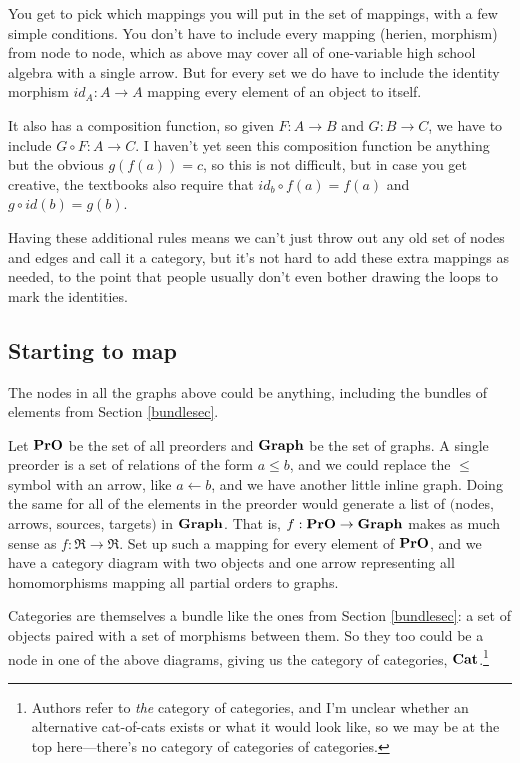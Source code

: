 \documentclass[11pt]{article}
\begin{document}
You get to pick which mappings you will put in the set of mappings, with a few simple conditions.
You don't have to include every mapping (herien, morphism) from node to node, which as above may cover all of one-variable high school algebra with a single arrow. But for every set we do have to include
the identity morphism $id_A:A\to A$ mapping every element of an object to itself.

It also has a composition function, so given $F:A\to B$
and $G:B\to C$, we have to include $G\circ F:A\to C$. I haven't yet seen this composition
function be anything but the obvious $g(f(a)) = c$, so this is not difficult, but in case
you get creative, the textbooks also require that $id_b\circ f(a)=f(a)$ and $g\circ id(b) = g(b)$.

Having these additional rules means we can't just throw out any old set of nodes and edges
and call it a category, but it's not hard to add these extra mappings as needed,
to the point that people usually don't even bother drawing the loops to mark the
identities.

\subsection{Starting to map}
The nodes in all the graphs above could be anything, including the bundles of elements from
Section \ref{bundlesec}.

Let ${\bf PrO}$ be the set of all preorders and ${\bf Graph}$ be the set of graphs. A
single preorder is a set of relations of the form $a \leq b$, and we could replace the $\leq$
symbol with an arrow, like $a\leftarrow b$, and we have another little inline graph. 
Doing the same for all of the elements in the preorder would generate a list of
$($nodes, arrows, sources, targets$)$ in ${\bf Graph}$.
That is, $f:{\bf PrO}\to {\bf Graph}$ makes as much sense as $f:\Re \to \Re$. Set up such
a mapping for every element of ${\bf PrO}$, and we have a category diagram with two
objects and one arrow representing all homomorphisms mapping all partial orders to graphs.

Categories are themselves a bundle like the ones from Section \ref{bundlesec}: a set
of objects paired with a set of morphisms between them. So they too could be a node in
one of the above diagrams, giving us the category of categories, ${\bf Cat}$.\footnote{Authors refer
to {\em the} category of categories, and I'm unclear whether an alternative cat-of-cats
exists or what it would look like, so we may be at the top here---there's no category of
categories of categories.}
\end{document}
